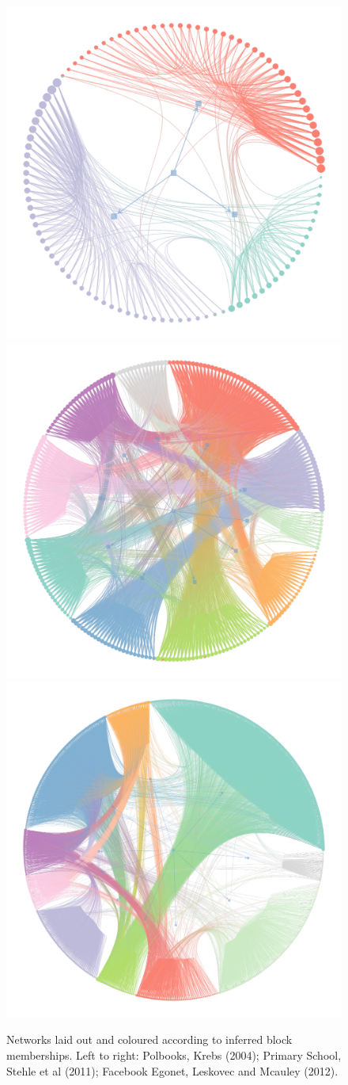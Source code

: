 \begin{figure}[!ht]
	\centering
	\includegraphics[width=0.28\linewidth]{fig/trayfig3a}
	\includegraphics[width=0.28\linewidth]{fig/trayfig3b}
	\includegraphics[width=0.28\linewidth]{fig/trayfig3c}
	\caption{Networks laid out and coloured according to inferred block memberships. Left to right: Polbooks, Krebs (2004); Primary School, Stehle et al (2011); Facebook Egonet, Leskovec and Mcauley (2012).}
	\label{fig:graphs-all}
\end{figure}

\begin{table}[!ht]
	\centering
	\caption{Results averaged over $n=10$ iterations (mean $\pm$ std. dev.).}
	\label{tab:results}
\end{table}